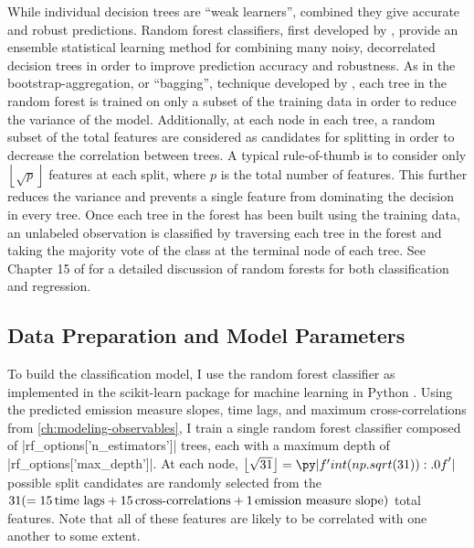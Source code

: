 While individual decision trees are ``weak learners'', combined they give accurate and robust predictions. Random forest classifiers, first developed by \citet{breiman_random_2001}, provide an ensemble statistical learning method for combining many noisy, decorrelated decision trees in order to improve prediction accuracy and robustness. As in the bootstrap-aggregation, or ``bagging'', technique developed by \citet{breiman_bagging_1996}, each tree in the random forest is trained on only a subset of the training data in order to reduce the variance of the model. Additionally, at each node in each tree, a random subset of the total features are considered as candidates for splitting in order to decrease the correlation between trees. A typical rule-of-thumb is to consider only $\left\lfloor\sqrt{p}\right\rfloor$ features at each split, where $p$ is the total number of features. This further reduces the variance and prevents a single feature from dominating the decision in every tree. Once each tree in the forest has been built using the training data, an unlabeled observation is classified by traversing each tree in the forest and taking the majority vote of the class at the terminal node of each tree. See Chapter 15 of \citet{hastie_elements_2009} for a detailed discussion of random forests for both classification and regression.

\subsection{Data Preparation and Model Parameters}\label{sec:classifying-observables:data-prep}

To build the classification model, I use the random forest classifier as implemented in the scikit-learn package for machine learning in Python \citep{pedregosa_scikit-learn_2011}. Using the predicted emission measure slopes, time lags, and maximum cross-correlations from \autoref{ch:modeling-observables}, I train a single random forest classifier composed of |rf_options['n_estimators']| trees, each with a maximum depth of |rf_options['max_depth']|. At each node, $\left\lfloor\sqrt{31}\right\rfloor=\py|f'{int(np.sqrt(31)):.0f}'|$ possible split candidates are randomly selected from the $31(=15\,\textup{time lags} + 15\,\textup{cross-correlations} + 1\,\textup{emission measure slope})$ total features. Note that all of these features are likely to be correlated with one another to some extent.

